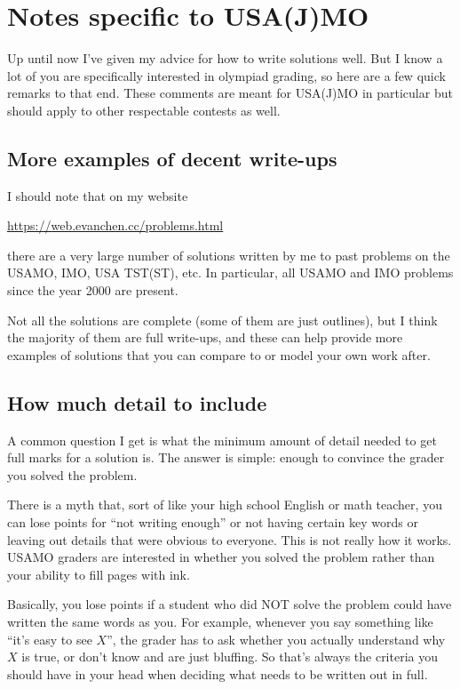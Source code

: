 \documentclass[11pt]{scrartcl}
\begin{document}
\newpage

\appendix
\section{Notes specific to USA(J)MO}
Up until now I've given my advice for how to write solutions well.
But I know a lot of you are specifically interested in olympiad grading,
so here are a few quick remarks to that end.
These comments are meant for USA(J)MO in particular
but should apply to other respectable contests as well.

\subsection{More examples of decent write-ups}
I should note that on my website
\begin{center}
	\url{https://web.evanchen.cc/problems.html}
\end{center}
there are a very large number of solutions written by me
to past problems on the USAMO, IMO, USA TST(ST), etc.
In particular, all USAMO and IMO problems since the year 2000
are present.

Not all the solutions are complete
(some of them are just outlines),
but I think the majority of them are full write-ups,
and these can help provide more examples of solutions
that you can compare to or model your own work after.

\subsection{How much detail to include}
A common question I get is what the minimum amount of detail needed
to get full marks for a solution is.
The answer is simple: enough to convince the grader you solved the problem.

There is a myth that, sort of like your high school English or math teacher,
you can lose points for ``not writing enough'' or not having certain key words
or leaving out details that were obvious to everyone.
This is not really how it works.
USAMO graders are interested in whether you solved the problem
rather than your ability to fill pages with ink.

Basically, \alert{you lose points if a student who did NOT solve the problem
could have written the same words as you}.
For example, whenever you say something like ``it's easy to see $X$'',
the grader has to ask whether you actually understand why $X$ is true,
or don't know and are just bluffing.
So that's always the criteria you should have in your head
when deciding what needs to be written out in full.
\end{document}
